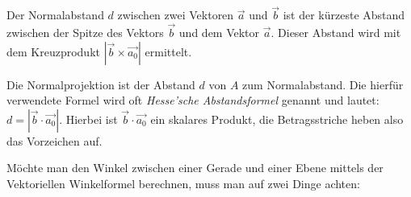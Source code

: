 
Der Normalabstand $d$ zwischen zwei Vektoren $\vec{a}$ und $\vec{b}$ ist der k\"{u}rzeste Abstand zwischen der Spitze des Vektors $\vec{b}$ und dem Vektor $\vec{a}$. Dieser Abstand wird mit dem Kreuzprodukt $|\vec{b} \times \vec{a_0}|$ ermittelt.

\begin{figure}[h!]
  \centering
\end{figure}


Die Normalprojektion ist der Abstand $d$ von $A$ zum Normalabstand. Die hierf\"{u}r verwendete Formel wird oft \emph{Hesse'sche Abstandsformel} genannt und lautet: $d = |\vec{b} \cdot \vec{a_0}|$. Hierbei ist $\vec{b} \cdot \vec{a_0}$ ein skalares Produkt, die Betragsstriche heben also das Vorzeichen auf.

\begin{figure}[h!]
  \centering
\end{figure}


M\"{o}chte man den Winkel zwischen einer Gerade und einer Ebene mittels der Vektoriellen Winkelformel berechnen, muss man auf zwei Dinge achten:

